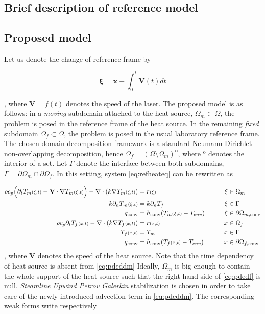 \subsection{Brief description of reference model}
  

\subsection{Proposed model}

Let us denote the change of reference frame by

$$
\mathbf{\xi} = \mathbf{x} - \int_0^t \mathbf{V}(t) dt
$$

, where $\mathbf{V} = f(t)$ denotes the
speed of the laser.
The proposed model is as follows:
in a \textit{moving} subdomain attached to the heat source,
$\Omega_m \subset \Omega$,
the problem is posed in the reference frame of the heat source.
In the remaining
\textit{fixed} subdomain $\Omega_f \subset \Omega$,
the problem is posed
in the usual laboratory reference frame.
The chosen domain decomposition framework is
a standard Neumann Dirichlet non-overlapping decomposition,
hence $\Omega_f = (\Omega \setminus \Omega_m)^{\mathrm{o}}$,
where ${}^{\mathrm{o}}$ denotes the interior of a set. Let
$\Gamma$ denote the interface between both subdomains,
$\Gamma = \partial \Omega_m \cap \partial \Omega_f$. In this
setting, system \ref{eq:refheateq} can be rewritten as

\begin{align}
  \rho c_p \Big( \partial_t T_m{\scriptstyle (\xi, t)} - \mathbf{V} \cdot \nabla T_m{\scriptstyle (\xi, t)} \Big) -
  \nabla \cdot ( k \nabla T_m{\scriptstyle (\xi, t)}) &= r{\scriptstyle (\xi)}  &\xi &\in \Omega_m \label{eq:pdeddm}\\
  k \partial_n T_m{\scriptstyle (\xi, t)} &= k \partial_n T_f  &\xi &\in \Gamma \notag\\
  q_{\textrm{conv}} &= h_{\textrm{conv}} ( T_m{\scriptstyle(\xi,t)} - T_{env} ) \qquad &\xi &\in \partial \Omega_{m, \textrm{conv}}\notag\\
  \rho c_p \partial_t T_f{\scriptstyle (x, t)} - \nabla \cdot (k \nabla T_f{\scriptstyle (x, t)}) &= r{\scriptstyle (x, t)} \qquad &x &\in \Omega_f \label{eq:pdedf}\\
  T_f{\scriptstyle (x, t)} &= T_m \qquad &x &\in \Gamma \notag\\
  q_{\textrm{conv}} &= h_{\textrm{conv}} ( T_f{\scriptstyle(x,t)} - T_{env} ) \qquad &x &\in \partial \Omega_{f, \textrm{conv}}\notag
\end{align}
, where $\mathbf{V}$ denotes the speed of the heat source. Note that
the time dependency of heat source is absent from \ref{eq:pdeddm}
Ideally, $\Omega_m$ is big enough
to contain the whole support of the heat source such that
the right hand side of \ref{eq:pdedf} is null.
\textit{Steamline Upwind Petrov Galerkin} stabilization is chosen
in order to take care of the newly introduced advection term
in \ref{eq:pdeddm}. The corresponding weak forms write respectively

